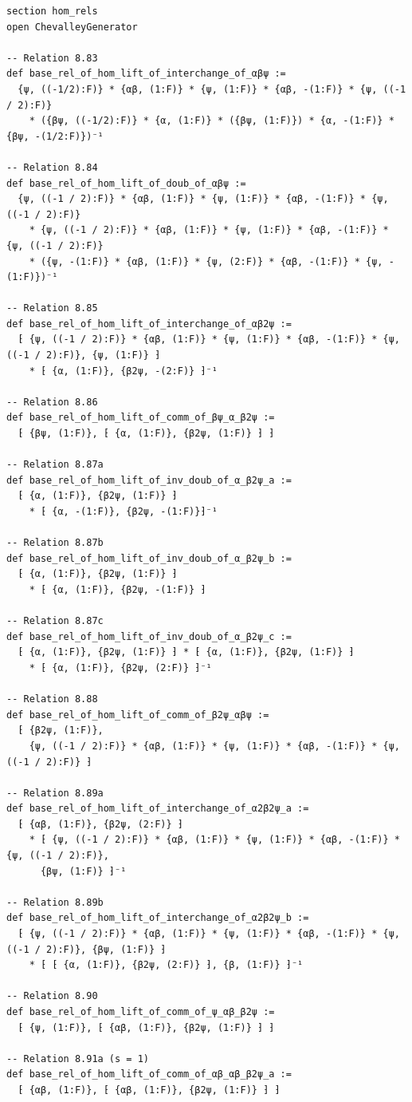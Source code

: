\documentclass[10pt,a4paper]{article}
\begin{document}
\begin{Verbatim}
section hom_rels
open ChevalleyGenerator

-- Relation 8.83
def base_rel_of_hom_lift_of_interchange_of_αβψ :=
  {ψ, ((-1/2):F)} * {αβ, (1:F)} * {ψ, (1:F)} * {αβ, -(1:F)} * {ψ, ((-1 / 2):F)}
    * ({βψ, ((-1/2):F)} * {α, (1:F)} * ({βψ, (1:F)}) * {α, -(1:F)} * {βψ, -(1/2:F)})⁻¹

-- Relation 8.84
def base_rel_of_hom_lift_of_doub_of_αβψ :=
  {ψ, ((-1 / 2):F)} * {αβ, (1:F)} * {ψ, (1:F)} * {αβ, -(1:F)} * {ψ, ((-1 / 2):F)}
    * {ψ, ((-1 / 2):F)} * {αβ, (1:F)} * {ψ, (1:F)} * {αβ, -(1:F)} * {ψ, ((-1 / 2):F)}
    * ({ψ, -(1:F)} * {αβ, (1:F)} * {ψ, (2:F)} * {αβ, -(1:F)} * {ψ, -(1:F)})⁻¹

-- Relation 8.85
def base_rel_of_hom_lift_of_interchange_of_αβ2ψ :=
  ⁅ {ψ, ((-1 / 2):F)} * {αβ, (1:F)} * {ψ, (1:F)} * {αβ, -(1:F)} * {ψ, ((-1 / 2):F)}, {ψ, (1:F)} ⁆
    * ⁅ {α, (1:F)}, {β2ψ, -(2:F)} ⁆⁻¹

-- Relation 8.86
def base_rel_of_hom_lift_of_comm_of_βψ_α_β2ψ :=
  ⁅ {βψ, (1:F)}, ⁅ {α, (1:F)}, {β2ψ, (1:F)} ⁆ ⁆

-- Relation 8.87a
def base_rel_of_hom_lift_of_inv_doub_of_α_β2ψ_a :=
  ⁅ {α, (1:F)}, {β2ψ, (1:F)} ⁆
    * ⁅ {α, -(1:F)}, {β2ψ, -(1:F)}⁆⁻¹

-- Relation 8.87b
def base_rel_of_hom_lift_of_inv_doub_of_α_β2ψ_b :=
  ⁅ {α, (1:F)}, {β2ψ, (1:F)} ⁆
    * ⁅ {α, (1:F)}, {β2ψ, -(1:F)} ⁆

-- Relation 8.87c
def base_rel_of_hom_lift_of_inv_doub_of_α_β2ψ_c :=
  ⁅ {α, (1:F)}, {β2ψ, (1:F)} ⁆ * ⁅ {α, (1:F)}, {β2ψ, (1:F)} ⁆
    * ⁅ {α, (1:F)}, {β2ψ, (2:F)} ⁆⁻¹

-- Relation 8.88
def base_rel_of_hom_lift_of_comm_of_β2ψ_αβψ :=
  ⁅ {β2ψ, (1:F)},
    {ψ, ((-1 / 2):F)} * {αβ, (1:F)} * {ψ, (1:F)} * {αβ, -(1:F)} * {ψ, ((-1 / 2):F)} ⁆

-- Relation 8.89a
def base_rel_of_hom_lift_of_interchange_of_α2β2ψ_a :=
  ⁅ {αβ, (1:F)}, {β2ψ, (2:F)} ⁆
    * ⁅ {ψ, ((-1 / 2):F)} * {αβ, (1:F)} * {ψ, (1:F)} * {αβ, -(1:F)} * {ψ, ((-1 / 2):F)},
      {βψ, (1:F)} ⁆⁻¹

-- Relation 8.89b
def base_rel_of_hom_lift_of_interchange_of_α2β2ψ_b :=
  ⁅ {ψ, ((-1 / 2):F)} * {αβ, (1:F)} * {ψ, (1:F)} * {αβ, -(1:F)} * {ψ, ((-1 / 2):F)}, {βψ, (1:F)} ⁆
    * ⁅ ⁅ {α, (1:F)}, {β2ψ, (2:F)} ⁆, {β, (1:F)} ⁆⁻¹

-- Relation 8.90
def base_rel_of_hom_lift_of_comm_of_ψ_αβ_β2ψ :=
  ⁅ {ψ, (1:F)}, ⁅ {αβ, (1:F)}, {β2ψ, (1:F)} ⁆ ⁆

-- Relation 8.91a (s = 1)
def base_rel_of_hom_lift_of_comm_of_αβ_αβ_β2ψ_a :=
  ⁅ {αβ, (1:F)}, ⁅ {αβ, (1:F)}, {β2ψ, (1:F)} ⁆ ⁆


\end{Verbatim}
\end{document}
